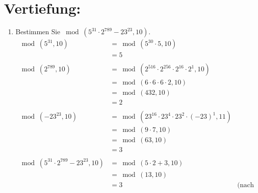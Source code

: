 



	\maketitle
	\section*{Vertiefung:}
	\begin{enumerate}[label=(\alph*)]
		\item  Bestimmen Sie $ \bmod(5^{31} \cdot 2^{789}-23^{23}, 10) $.
		\begin{align*}
			\bmod(5^{31},10) &= \bmod(5^{30}\cdot5,10) 
			\\&= 5 \\\\
			\bmod(2^{789},10) &= \bmod(2^{516}\cdot2^{256}\cdot2^{16}\cdot2^1,10) 
			\\&= \bmod(6\cdot 6\cdot 6\cdot 2, 10) 
			\\&= \bmod(432,10) 
			\\&= 2 \\\\
			\bmod(-23^{23},10) &= \bmod(23^{16}\cdot23^{4}\cdot23^{2}\cdot(-23)^1,11) 
			\\&= \bmod(9\cdot 7, 10) 
			\\&= \bmod(63,10) 
			\\&= 3 \\\\
			\bmod(5^{31} \cdot 2^{789}-23^{23}, 10) &= \bmod(5 \cdot 2 + 3,10)	
			\\&= \bmod(13,10) 
			\\&= 3
		 	&\textrm{(nach Theorem 1.2 (BM))}
		\end{align*}


\end{enumerate}
